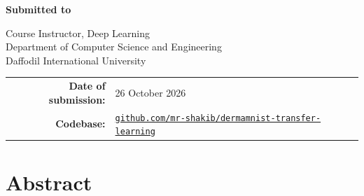 \documentclass[11pt,a4paper]{article}
\newcommand{\repo}{https://github.com/mr-shakib/dermamnist-transfer-learning}
\begin{document}
\begin{titlepage}
{\large\bfseries Submitted to\par}
\vspace{0.15cm}
Course Instructor, Deep Learning\\
Department of Computer Science and Engineering\\
Daffodil International University\par
\vfill
\begin{tabular}{rl}
\textbf{Date of submission:} & 26 October 2026 \\
\textbf{Codebase:} & \href{\repo}{\texttt{github.com/mr-shakib/dermamnist-transfer-learning}} \\
\end{tabular}
\end{titlepage}

\section*{Abstract}


\vspace{0.6cm}
\tableofcontents
\clearpage
\listoffigures
\listoftables
\clearpage
{}









\appendix

\end{document}
